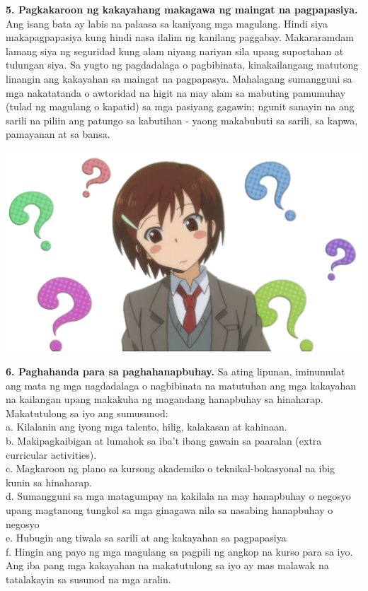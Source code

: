 \documentclass[10pt,a4paper]{article}
\begin{document}
\begin{multicols*}{3}
\textbf{5. Pagkakaroon ng kakayahang makagawa ng maingat na pagpapasiya.} Ang isang bata ay labis na palaasa sa kaniyang mga magulang. Hindi siya makapagpapasiya kung hindi nasa ilalim ng kanilang paggabay. Makararamdam lamang siya ng seguridad kung alam niyang nariyan sila upang suportahan at tulungan siya. Sa yugto ng pagdadalaga o pagbibinata, kinakailangang matutong linangin ang kakayahan sa maingat na pagpapasya. Mahalagang sumangguni sa mga nakatatanda o awtoridad na higit na may alam sa mabuting pamumuhay (tulad ng magulang o kapatid) sa mga pasiyang gagawin; ngunit sanayin na ang sarili na piliin ang patungo sa kabutihan - yaong makabubuti sa sarili, sa kapwa, pamayanan at sa bansa.\\
\begin{center}
			\includegraphics[width=0.8\linewidth]{G7_Modyul_Images/daily-lives-of-high-school-boys-anime-nichijou-hid-5af7edf2166904_1087153315261977460918.png}
		\end{center}
\textbf{6. Paghahanda para sa paghahanapbuhay.} Sa ating lipunan, iminumulat ang mata ng mga nagdadalaga o nagbibinata na matutuhan ang mga kakayahan na kailangan upang makakuha ng magandang hanapbuhay sa hinaharap. Makatutulong sa iyo ang sumusunod:\\
a. Kilalanin ang iyong mga talento, hilig, kalakasan at kahinaan.\\
b. Makipagkaibigan at lumahok sa iba't ibang gawain sa paaralan (extra curricular activities).\\
c. Magkaroon ng plano sa kursong akademiko o teknikal-bokasyonal na ibig kunin sa hinaharap.\\
d. Sumangguni sa mga matagumpay na kakilala na may hanapbuhay o negosyo upang magtanong tungkol sa mga ginagawa nila sa nasabing hanapbuhay o negosyo\\
e. Hubugin ang tiwala sa sarili at ang kakayahan sa pagpapasiya\\
f. Hingin ang payo ng mga magulang sa pagpili ng angkop na kurso para sa iyo.\\
Ang iba pang mga kakayahan na makatutulong sa iyo ay mas malawak na tatalakayin sa susunod na mga aralin.\\


\end{multicols*}
\end{document}
